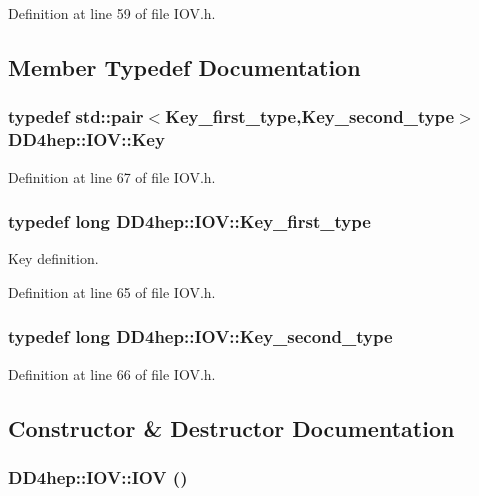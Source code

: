 Definition at line 59 of file IOV.h.

\subsection{Member Typedef Documentation}
\hypertarget{class_d_d4hep_1_1_i_o_v_a07cb46dc875296dc9cccf4ff370104ae}{
\subsubsection[{Key}]{\setlength{\rightskip}{0pt plus 5cm}typedef std::pair$<${\bf Key\_\-first\_\-type},{\bf Key\_\-second\_\-type}$>$ {\bf DD4hep::IOV::Key}}}
\label{class_d_d4hep_1_1_i_o_v_a07cb46dc875296dc9cccf4ff370104ae}


Definition at line 67 of file IOV.h.\hypertarget{class_d_d4hep_1_1_i_o_v_a3f518f6b507c82c4ee614e52b3519325}{
\subsubsection[{Key\_\-first\_\-type}]{\setlength{\rightskip}{0pt plus 5cm}typedef long {\bf DD4hep::IOV::Key\_\-first\_\-type}}}
\label{class_d_d4hep_1_1_i_o_v_a3f518f6b507c82c4ee614e52b3519325}


Key definition. 

Definition at line 65 of file IOV.h.\hypertarget{class_d_d4hep_1_1_i_o_v_ae1e4d1584dcc17a416008a93d94376b5}{
\subsubsection[{Key\_\-second\_\-type}]{\setlength{\rightskip}{0pt plus 5cm}typedef long {\bf DD4hep::IOV::Key\_\-second\_\-type}}}
\label{class_d_d4hep_1_1_i_o_v_ae1e4d1584dcc17a416008a93d94376b5}


Definition at line 66 of file IOV.h.

\subsection{Constructor \& Destructor Documentation}
\hypertarget{class_d_d4hep_1_1_i_o_v_a1ba2ab174011fccf1dba8cd60e1d6bd1}{
\subsubsection[{IOV}]{\setlength{\rightskip}{0pt plus 5cm}DD4hep::IOV::IOV ()}}
\label{class_d_d4hep_1_1_i_o_v_a1ba2ab174011fccf1dba8cd60e1d6bd1}


